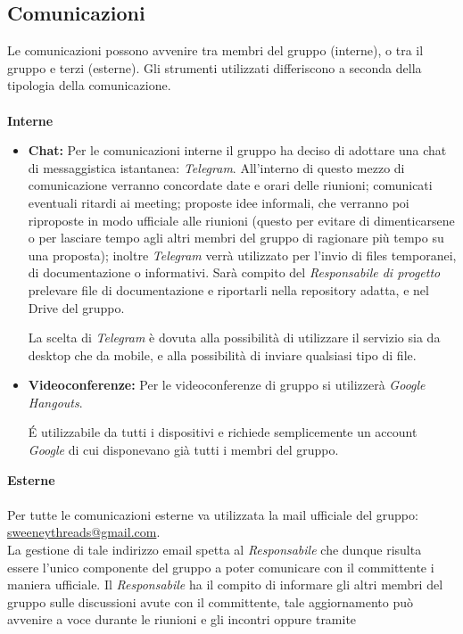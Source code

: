 \documentclass[a4paper]{report}
\begin{document}
	\subsection{Comunicazioni}
	\label{sec:Comunicazioni}
	Le comunicazioni possono avvenire tra membri del gruppo (interne), o tra il gruppo e terzi (esterne). Gli
	strumenti utilizzati differiscono a seconda della tipologia della comunicazione. \\ \\
	\textbf{Interne} 
	\begin{itemize}
		\item \textbf{Chat:} Per le comunicazioni interne il gruppo ha deciso di adottare una chat di messaggistica 
		istantanea: \emph{Telegram}. All'interno di questo mezzo di comunicazione verranno concordate date e orari 
		delle riunioni; comunicati eventuali ritardi ai meeting; proposte idee informali, che verranno poi riproposte 
		in modo ufficiale alle riunioni (questo per evitare di dimenticarsene o per lasciare tempo agli altri membri 
		del gruppo di ragionare più tempo su una proposta); inoltre \emph{Telegram} verrà utilizzato per l'invio di files
		temporanei, di documentazione o informativi. Sarà compito del \emph{Responsabile di progetto} prelevare file di documentazione 
		e riportarli nella repository adatta, e nel Drive del gruppo.
		
		La scelta di \emph{Telegram} è dovuta alla possibilità di utilizzare il servizio sia da desktop che da mobile, e alla 
		possibilità di inviare qualsiasi tipo di file.
		\item \textbf{Videoconferenze:} Per le videoconferenze di gruppo si utilizzerà \emph{Google Hangouts}. 
		
		\'E utilizzabile da tutti i dispositivi e richiede semplicemente un account \emph{Google} di cui disponevano 
		già tutti i membri del gruppo.
	\end{itemize}
	\textbf{Esterne}  \\ \\ 
	Per tutte le comunicazioni esterne va utilizzata la mail ufficiale del gruppo: \href{mailto:sweeneythreads@gmail.com}%
	{sweeneythreads@gmail.com}. \\ La gestione di 
	tale indirizzo email spetta al \emph{Responsabile} che dunque risulta essere l'unico componente del gruppo a poter comunicare
	con il committente i maniera ufficiale. Il \emph{Responsabile} ha il compito di informare gli altri membri del gruppo sulle 
	discussioni avute con il committente, tale aggiornamento può avvenire a voce durante le riunioni e gli incontri oppure tramite
\end{document}
